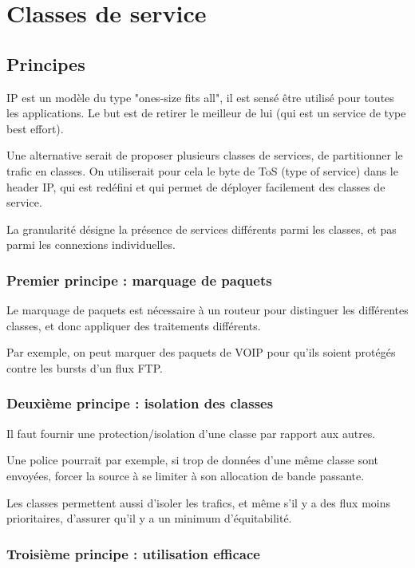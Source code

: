 \documentclass[10pt,a4paper]{report}
\begin{document}
	\section{Classes de service}
	
		\subsection{Principes}
		
		IP est un modèle du type "ones-size fits all", il est sensé être utilisé pour toutes les applications. Le but est de retirer le meilleur de lui (qui est un service de type best effort).
		
		Une alternative serait de proposer plusieurs classes de services, de partitionner le trafic en classes. On utiliserait pour cela le byte de ToS (type of service) dans le header IP, qui est redéfini et qui permet de déployer facilement des classes de service.
		
		La granularité désigne la présence de services différents parmi les classes, et pas parmi les connexions individuelles.
		
		\subsubsection{Premier principe : marquage de paquets}
		
		Le marquage de paquets est nécessaire à un routeur pour distinguer les différentes classes, et donc appliquer des traitements différents.
		
		Par exemple, on peut marquer des paquets de VOIP pour qu'ils soient protégés contre les bursts d'un flux FTP.
		
		\subsubsection{Deuxième principe : isolation des classes}
		
		Il faut fournir une protection/isolation d'une classe par rapport aux autres.
			
		Une police pourrait par exemple, si trop de données d'une même classe sont envoyées, forcer la source à se limiter à son allocation de bande passante.		
				
		Les classes permettent aussi d'isoler les trafics, et même s'il y a des flux moins prioritaires, d'assurer qu'il y a un minimum d'équitabilité. 
		
		\subsubsection{Troisième principe : utilisation efficace}
		
\end{document}
